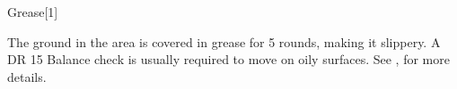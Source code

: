 \begin{spellsection}{Grease}[1]
    \begin{spellheader}
    \end{spellheader}
    \begin{spellcontent}
        \begin{spelltargetinginfo}
        \end{spelltargetinginfo}
        \begin{spelleffects}
            \spelleffect The ground in the area is covered in grease for 5 rounds, making it slippery. A DR 15 Balance check is usually required to move on oily surfaces. See , for more details.
        \end{spelleffects}
    \end{spellcontent}
    \begin{spellfooter}
        \spellnotes \physicalspellnotes
        \miscastyou
    \end{spellfooter}
    \begin{spellaugments}
    \end{spellaugments}
\end{spellsection}

